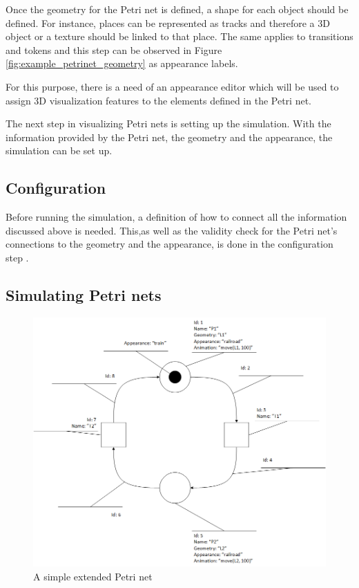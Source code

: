 Once the geometry for the Petri net is defined, a shape for each object should be defined. For instance, places can be represented as tracks and therefore a 3D object or a texture should be linked to that place. The same applies to transitions and tokens and this step can be observed in Figure \ref{fig:example_petrinet_geometry} as appearance labels. 

For this purpose, there is a need of an appearance editor which will be used to assign 3D visualization features to the elements defined in the Petri net.

The next step in visualizing Petri nets is setting up the simulation. With the information provided by the Petri net, the geometry and the appearance, the simulation can be set up.

\subsection{Configuration}
Before running the simulation, a definition of how to connect all the information discussed above is needed. This,as well as the validity check for the Petri net's connections to the geometry and the appearance, is done in the configuration step . 

\subsection{Simulating Petri nets}

\begin{figure}[htp]
\begin{center}
	\includegraphics[width=\textwidth]{image/example_petrinet.png}
	\caption{A simple extended Petri net}
	\label{fig:example_petrinet}
\end{center}
\end{figure}

